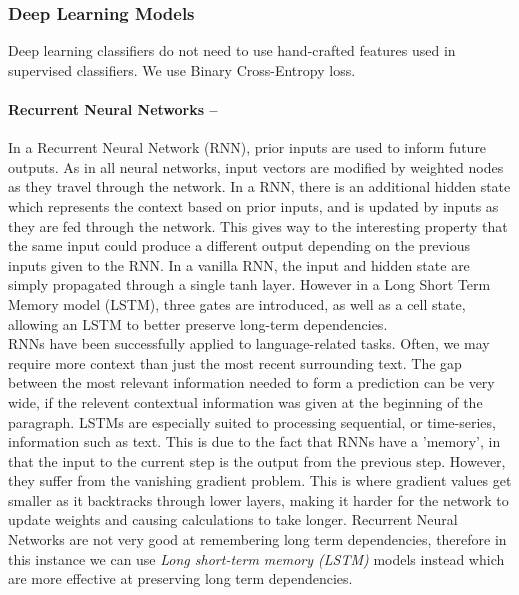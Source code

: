 \documentclass[12pt,a4paper]{article}
\begin{document}
\subsubsection{Deep Learning Models}
Deep learning classifiers do not need to use hand-crafted features used in supervised classifiers. We use Binary Cross-Entropy loss.

\paragraph{Recurrent Neural Networks --}
In a Recurrent Neural Network (RNN), prior inputs are used to inform future outputs. As in all neural networks, input vectors are modified by weighted nodes as they travel through the network. In a RNN, there is an additional hidden state which represents the context based on prior inputs, and is updated by inputs as they are fed through the network. This gives way to the interesting property that the same input could produce a different output depending on the previous inputs given to the RNN. In a vanilla RNN, the input and hidden state are simply propagated through a single tanh layer. However in a Long Short Term Memory model (LSTM), three gates are introduced, as well as a cell state, allowing an LSTM to better preserve long-term dependencies.\\

RNNs have been successfully applied to language-related tasks. Often, we may require more context than just the most recent surrounding text. The gap between the most relevant information needed to form a prediction can be very wide, if the relevent contextual information was given at the beginning of the paragraph. LSTMs are especially suited to processing sequential, or time-series, information such as text. This is due to the fact that RNNs have a 'memory', in that the input to the current step is the output from the previous step. However, they suffer from the vanishing gradient problem. This is where gradient values get smaller as it backtracks through lower layers, making it harder for the network to update weights and causing calculations to take longer. Recurrent Neural Networks are not very good at remembering long term dependencies, therefore in this instance we can use \textit{Long short-term memory (LSTM)} models \cite{hochreiter1997long} instead which are more effective at preserving long term dependencies.
\end{document}
